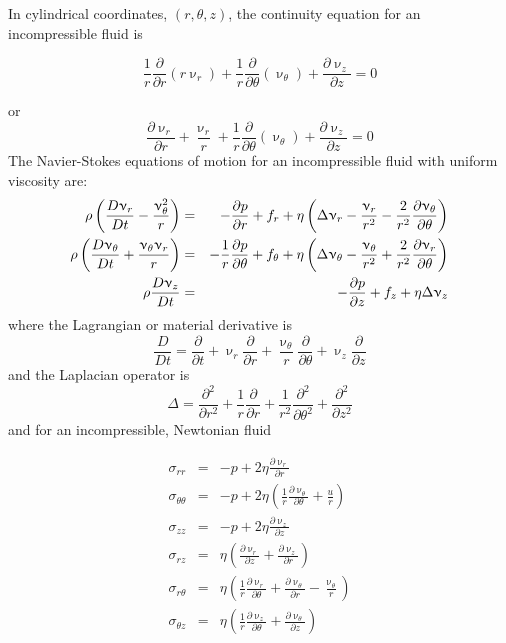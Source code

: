 In cylindrical coordinates, $(r,\theta,z)$, the continuity equation for an incompressible fluid is 
\begin{mdframed}[backgroundcolor=blue!5]
\begin{equation}
\frac{1}{r} \frac{\partial}{\partial r} (r \upnu_r) + 
\frac{1}{r} \frac{\partial}{\partial \theta} (\upnu_\theta) + 
\frac{\partial \upnu_z}{\partial z} =0
\end{equation}
\end{mdframed}
or
\begin{equation}
\frac{\partial \upnu_r }{\partial r}  + \frac{\upnu_r}{r} +
\frac{1}{r} \frac{\partial}{\partial \theta} (\upnu_\theta) + 
\frac{\partial \upnu_z}{\partial z} =0
\end{equation}
The Navier-Stokes equations of motion for an incompressible fluid with uniform viscosity are:
\begin{eqnarray}
\rho \left(  \frac{D\upnu_r}{Dt} -\frac{\upnu_\theta^2}{r} \right) 
&=& -\frac{\partial p}{\partial r} + f_r + \eta
\left( \Delta \upnu_r - \frac{\upnu_r}{r^2} - \frac{2}{r^2} \frac{\partial \upnu_\theta}{\partial \theta}
\right)
\nonumber\\
\rho \left(  \frac{D\upnu_\theta}{Dt} +\frac{\upnu_\theta \upnu_r}{r} \right) 
&=&
-\frac{1}{r} \frac{\partial p}{\partial \theta} + f_\theta + \eta
\left(
\Delta \upnu_\theta - \frac{\upnu_\theta}{r^2} + \frac{2}{r^2} \frac{\partial \upnu_r}{\partial\theta}
\right)
\nonumber\\
\rho \frac{D\upnu_z}{Dt} 
&=& 
-\frac{\partial p}{\partial z} + f_z + \eta \Delta \upnu_z
\end{eqnarray}
where the Lagrangian or material derivative is
\[
\frac{D}{Dt} = \frac{\partial}{\partial t} 
+ \upnu_r \frac{\partial}{\partial r}  
+ \frac{\upnu_\theta}{r} \frac{\partial}{\partial \theta}
+ \upnu_z \frac{\partial}{\partial z}  
\]
and the Laplacian operator is   
\begin{equation}
\Delta 
= \frac{\partial^2 }{\partial r^2}  +\frac{1}{r} \frac{\partial }{\partial r}
+ \frac{1}{r^2}  \frac{\partial^2}{\partial \theta^2}
+ \frac{\partial^2 }{\partial z^2}
\end{equation}
and for an incompressible, Newtonian fluid

\begin{eqnarray}
\sigma_{rr}&=& -p + 2 \eta \frac{\partial \upnu_r}{\partial r} \\
\sigma_{\theta\theta}&=& -p +2\eta \left( \frac{1}{r} \frac{\partial \upnu_\theta}{\partial \theta} +\frac{u}{r}\right)\\
\sigma_{zz}&=& -p + 2 \eta \frac{\partial \upnu_z}{\partial z} \\
\sigma_{rz}&=& \eta \left( \frac{\partial \upnu_r}{\partial z}+\frac{\partial \upnu_z}{\partial r}\right)\\
\sigma_{r\theta}&=&\eta\left( \frac{1}{r} \frac{\partial \upnu_r}{\partial \theta}
+\frac{\partial \upnu_\theta}{\partial r} - \frac{\upnu_\theta}{r}   \right) \\
\sigma_{\theta z} &=& \eta \left( \frac{1}{r} \frac{\partial \upnu_z}{\partial\theta} 
+ \frac{\partial \upnu_\theta}{\partial z} \right)
\end{eqnarray}

